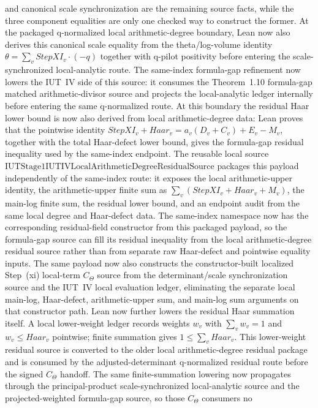 \documentclass[11pt]{article}
\theoremstyle{plain}
\theoremstyle{definition}
\theoremstyle{remark}
\begin{document}
and canonical scale synchronization are the remaining source facts, while the
three component equalities are only one checked way to construct the former.
At the packaged q-normalized local arithmetic-degree boundary, Lean now also
derives this canonical scale equality from the theta/log-volume identity
\(\theta=\sum_v StepXI_v\cdot(-q)\) together with q-pilot positivity before
entering the scale-synchronized local-analytic route.
The same-index formula-gap refinement now lowers the IUT~IV side of this
source: it consumes the Theorem~1.10 formula-gap matched arithmetic-divisor
source and projects the local-analytic ledger internally before entering the
same q-normalized route.  At this boundary the residual Haar lower bound is
now also derived from local arithmetic-degree data: Lean proves that the
pointwise identity
\(StepXI_v+Haar_v=a_v(D_v+C_v)+E_v-M_v\), together with the total Haar-defect
lower bound, gives the formula-gap residual inequality used by the same-index
endpoint.  The reusable local source
\(\mathrm{IUTStage1IUTIVLocalArithmeticDegreeResidualSource}\) packages this
payload independently of the same-index route: it exposes the local
arithmetic-upper identity, the arithmetic-upper finite sum as
\(\sum_v(StepXI_v+Haar_v+M_v)\), the main-log finite sum, the residual lower
bound, and an endpoint audit from the same local degree and Haar-defect data.
The same-index namespace now has the corresponding residual-field constructor
from this packaged payload, so the formula-gap source can fill its residual
inequality from the local arithmetic-degree residual source rather than from
separate raw Haar-defect and pointwise equality inputs.  The same payload now
also constructs the constructor-built localized Step~(xi) local-term
\(C_\Theta\) source from the determinant/scale synchronization source and the
IUT~IV local evaluation ledger, eliminating the separate local main-log,
Haar-defect, arithmetic-upper sum, and main-log sum arguments on that
constructor path.
Lean now further lowers the residual Haar summation itself.  A local
lower-weight ledger records weights \(w_v\) with \(\sum_v w_v=1\) and
\(w_v\le Haar_v\) pointwise; finite summation gives
\(1\le\sum_v Haar_v\).  This lower-weight residual source is converted to the
older local arithmetic-degree residual package and is consumed by the
adjusted-determinant q-normalized residual route before the signed
\(C_\Theta\) handoff.  The same finite-summation lowering now propagates
through the principal-product scale-synchronized local-analytic source and the
projected-weighted formula-gap source, so those \(C_\Theta\) consumers no
\end{document}
